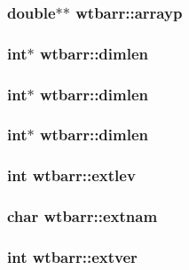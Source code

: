 \subsubsection{\setlength{\rightskip}{0pt plus 5cm}double$\ast$$\ast$ \bf{wtbarr::arrayp}}\label{structwtbarr_d7d5ac0a7880f57ab1a95a959a1711ec}


\subsubsection{\setlength{\rightskip}{0pt plus 5cm}int$\ast$ \bf{wtbarr::dimlen}}\label{structwtbarr_52de7766607c1260f13a90029edf7e73}


\subsubsection{\setlength{\rightskip}{0pt plus 5cm}int$\ast$ \bf{wtbarr::dimlen}}\label{structwtbarr_52de7766607c1260f13a90029edf7e73}


\subsubsection{\setlength{\rightskip}{0pt plus 5cm}int$\ast$ \bf{wtbarr::dimlen}}\label{structwtbarr_52de7766607c1260f13a90029edf7e73}


\subsubsection{\setlength{\rightskip}{0pt plus 5cm}int \bf{wtbarr::extlev}}\label{structwtbarr_10c8dba85b62e2794071dd50a41c4bb1}


\subsubsection{\setlength{\rightskip}{0pt plus 5cm}char \bf{wtbarr::extnam}}\label{structwtbarr_9f1fcad814aa3da08dfa75ede2a07deb}


\subsubsection{\setlength{\rightskip}{0pt plus 5cm}int \bf{wtbarr::extver}}\label{structwtbarr_24487eda7b17800f41bd4a452c6306d5}


